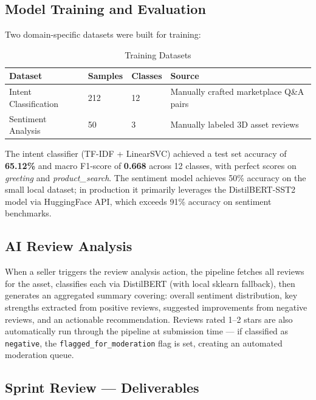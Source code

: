 \subsection{Model Training and Evaluation}

Two domain-specific datasets were built for training:

\begin{table}[H]
\centering
\caption{Training Datasets}
\begin{tabular}{L{3.5cm} C{2cm} C{2.2cm} L{5.5cm}}
\toprule
\textbf{Dataset}       & \textbf{Samples} & \textbf{Classes} & \textbf{Source} \\
\midrule
Intent Classification  & 212              & 12               & Manually crafted marketplace Q\&A pairs \\
Sentiment Analysis     & 50               & 3                & Manually labeled 3D asset reviews \\
\bottomrule
\end{tabular}
\end{table}

The intent classifier (TF-IDF + LinearSVC) achieved a test set accuracy of \textbf{65.12\%} and macro F1-score of \textbf{0.668} across 12 classes, with perfect scores on \textit{greeting} and \textit{product\_search}. The sentiment model achieves 50\% accuracy on the small local dataset; in production it primarily leverages the DistilBERT-SST2 model via HuggingFace API, which exceeds 91\% accuracy on sentiment benchmarks.

\subsection{AI Review Analysis}

When a seller triggers the review analysis action, the pipeline fetches all reviews for the asset, classifies each via DistilBERT (with local sklearn fallback), then generates an aggregated summary covering: overall sentiment distribution, key strengths extracted from positive reviews, suggested improvements from negative reviews, and an actionable recommendation. Reviews rated 1--2 stars are also automatically run through the pipeline at submission time — if classified as \texttt{negative}, the \texttt{flagged\_for\_moderation} flag is set, creating an automated moderation queue.

\subsection{Sprint Review --- Deliverables}

